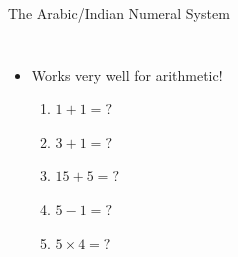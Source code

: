 \documentclass{beamer}
\begin{document}
\begin{frame}{The Arabic/Indian Numeral System}
\begin{columns}
\begin{itemize}[<+(3)->]
    \item Works very well for arithmetic!
    \begin{enumerate}
        \item $1+1=?$
        \item $3+1=?$
        \item $15+5=?$
        \item $5-1=?$
        \item $5\times 4=?$
    \end{enumerate}
\end{itemize}

\newline
{}
\end{columns}

\end{frame}
\end{document}
